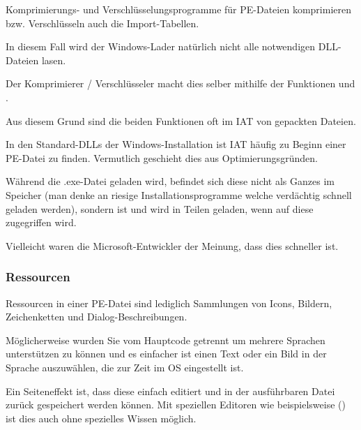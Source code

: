 Komprimierungs- und Verschlüsselungsprogramme für PE-Dateien komprimieren bzw.
Verschlüsseln auch die Import-Tabellen.

In diesem Fall wird der Windows-Lader natürlich nicht alle notwendigen DLL-Dateien lasen.

Der Komprimierer / Verschlüsseler macht dies selber mithilfe der Funktionen
 und .

Aus diesem Grund sind die beiden Funktionen oft im \ac{IAT} von gepackten Dateien.

In den Standard-DLLs der Windows-Installation ist \ac{IAT} häufig zu Beginn einer
PE-Datei zu finden. Vermutlich geschieht dies aus Optimierungsgründen.

Während die .exe-Datei geladen wird, befindet sich diese nicht als Ganzes im Speicher
(man denke an riesige Installationsprogramme welche verdächtig schnell geladen werden),
sondern ist  und wird in Teilen geladen, wenn auf diese zugegriffen wird.

Vielleicht waren die Microsoft-Entwickler der Meinung, dass dies schneller ist.

\subsubsection{Ressourcen}

\label{PEresources}

Ressourcen in einer PE-Datei sind lediglich Sammlungen von Icons, Bildern,
Zeichenketten und Dialog-Beschreibungen.

Möglicherweise wurden Sie vom Hauptcode getrennt um mehrere Sprachen unterstützen
zu können und es einfacher ist einen Text oder ein Bild in der Sprache auszuwählen,
die zur Zeit im \ac{OS} eingestellt ist.

Ein Seiteneffekt ist, dass diese einfach editiert und in der ausführbaren Datei
zurück gespeichert werden können. Mit speziellen Editoren wie beispielsweise
() ist dies auch ohne spezielles Wissen möglich.


